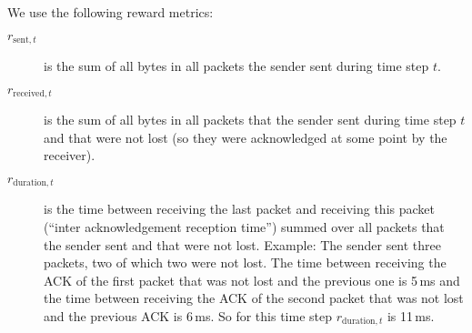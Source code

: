 \documentclass[sigconf]{acmart}
\begin{document}
We use the following reward metrics: 
\begin{description}
\item[$\textit{r}_{\text{sent},t}$] is the sum of all bytes in all packets the sender sent during time step $t$.
\item[$\textit{r}_{\text{received},t}$] is the sum of all bytes in all packets that the sender sent during time step $t$ and that were not lost (so they were acknowledged at some point by the receiver).
\item[$\textit{r}_{\text{duration},t}$] is the time between receiving the last packet and receiving this packet (``inter acknowledgement reception time'') summed over all packets that the sender sent and that were not lost. Example: The sender sent three packets, two of which two were not lost. The time between receiving the ACK of the first packet that was not lost and the previous one is 5\,ms and the time between receiving the ACK of the second packet that was not lost and the previous ACK is 6\,ms. So for this time step $\textit{r}_{\text{duration},t}$ is 11\,ms.
\end{description}

\end{document}

